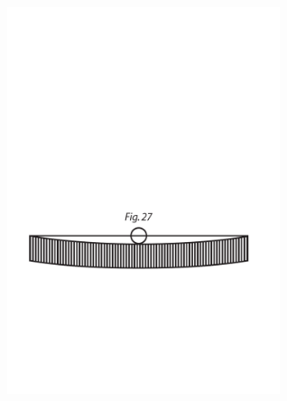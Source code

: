 \pend
\vspace{2.5em}
\pstart
\centering
\includegraphics[trim = 0mm -4mm 0mm 0mm, clip, width=0.6\textwidth]{images/LH0351506_014r-dext27.pdf}\\
\pend
\newpage

